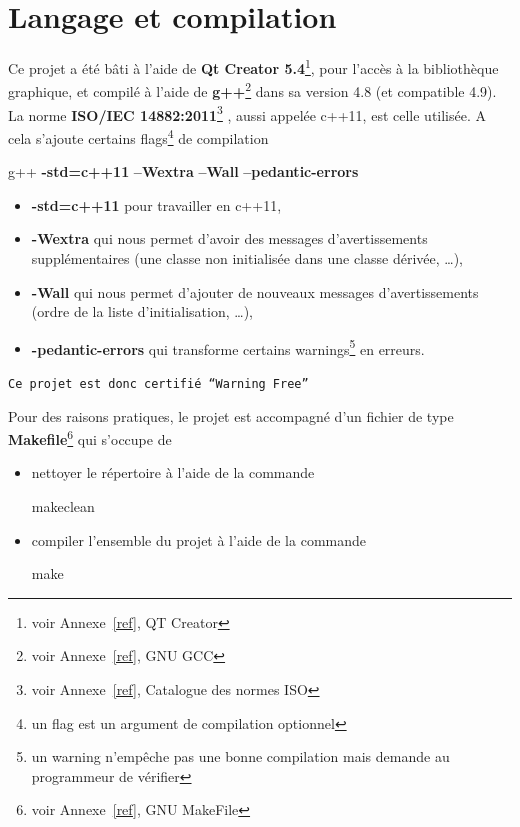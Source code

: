 \documentclass[a4paper,11pt]{report}
\begin{document}
\section{Langage et compilation}
Ce projet a été bâti à l'aide de \textbf{Qt Creator
5.4}\footnote{voir Annexe~\ref{ref}, QT Creator}, pour l'accès à la bibliothèque
graphique, et compilé à l'aide de
\textbf{g++}\footnote{voir Annexe~\ref{ref}, GNU GCC} dans sa version 4.8 (et
compatible 4.9). La norme \textbf{ISO/IEC
14882:2011}\footnote{voir Annexe~\ref{ref}, Catalogue des normes ISO}
, aussi appelée c++11, est celle
utilisée. A cela s'ajoute certains flags\footnote{un flag est un argument de
compilation optionnel} de compilation
\begin{center}
	g++
	\textbf{-std=c++11}\textvisiblespace
	\textbf{--Wextra}\textvisiblespace
	\textbf{--Wall}\textvisiblespace
	\textbf{--pedantic-errors}
\end{center}
\begin{itemize}
	\item \textbf{-std=c++11} pour travailler en c++11,
	\item \textbf{-Wextra} qui nous permet d'avoir des messages d'avertissements
		supplémentaires (une classe non initialisée dans une classe dérivée,
		\dots),
	\item \textbf{-Wall} qui nous permet d'ajouter de nouveaux messages
		d'avertissements (ordre de la liste d'initialisation, \dots),
	\item \textbf{-pedantic-errors} qui transforme certains warnings\footnote{un
			warning n'empêche pas une bonne compilation mais demande au
		programmeur de vérifier} en erreurs.
\end{itemize}
\begin{center}
	\texttt{Ce projet est donc certifié ``Warning Free''}
\end{center}
Pour des raisons pratiques, le projet est accompagné d'un fichier de type
\textbf{Makefile}\footnote{voir Annexe~\ref{ref}, GNU MakeFile} qui s'occupe de
\begin{itemize}
	\item nettoyer le répertoire à l'aide de la commande 
		\begin{center}
			make\textvisiblespace clean
		\end{center}
	\item compiler l'ensemble du projet à l'aide de la commande
		\begin{center}
			make
		\end{center}
\end{itemize}
\newpage
\end{document}
